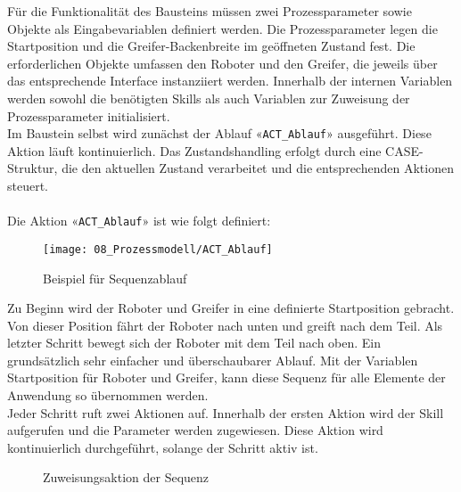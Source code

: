 		Für die Funktionalität des Bausteins müssen zwei Prozessparameter sowie Objekte als Eingabevariablen definiert werden. Die Prozessparameter legen die Startposition und die Greifer-Backenbreite im geöffneten Zustand fest. Die erforderlichen Objekte umfassen den Roboter und den Greifer, die jeweils über das entsprechende Interface instanziiert werden.
		Innerhalb der internen Variablen werden sowohl die benötigten Skills als auch Variablen zur Zuweisung der Prozessparameter initialisiert.
		\\
		Im Baustein selbst wird zunächst der Ablauf «\verb|ACT_Ablauf|» ausgeführt. Diese Aktion läuft kontinuierlich. Das Zustandshandling erfolgt durch eine CASE-Struktur, die den aktuellen Zustand verarbeitet und die entsprechenden Aktionen steuert.
		\\
		\\
		Die Aktion «\verb|ACT_Ablauf|» ist wie folgt definiert: 
		\\
		\begin{figure}[H]
			\centering
			\texttt{[image: 08\_Prozessmodell/ACT\_Ablauf]}
			\captionsetup{justification=centering}
			\caption{Beispiel für Sequenzablauf}
			\label{fig:Sequenzablauf}
		\end{figure}
		
		\newpage
		
		Zu Beginn wird der Roboter und Greifer in eine definierte Startposition gebracht. Von dieser Position fährt der Roboter nach unten und greift nach dem Teil. Als letzter Schritt bewegt sich der Roboter mit dem Teil nach oben. Ein grundsätzlich sehr einfacher und überschaubarer Ablauf. Mit der Variablen Startposition für Roboter und  Greifer, kann diese Sequenz für alle Elemente der Anwendung so übernommen werden.
		\\
		Jeder Schritt ruft zwei Aktionen auf.  Innerhalb der ersten Aktion wird der Skill aufgerufen und die Parameter werden zugewiesen. Diese Aktion wird kontinuierlich durchgeführt, solange der Schritt aktiv ist. 
		\\
		\begin{figure}[H]
			\centering
			\captionsetup{justification=centering}
			\caption{Zuweisungsaktion der Sequenz}
			\label{fig:Sequenz_Zuweisung}
		\end{figure}
		
